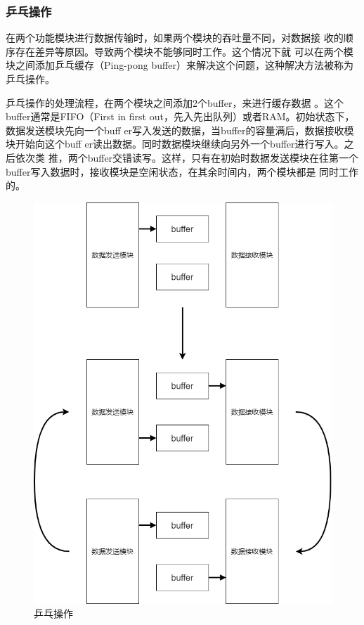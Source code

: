 \documentclass{article}
\numberwithin {equation}{section}
\begin{document}
\begin{spacing}{1.25}
        \subsubsection{乒乓操作}
          \vspace{1em}
          在两个功能模块进行数据传输时，如果两个模块的吞吐量不同，对数据接
          收的顺序存在差异等原因。导致两个模块不能够同时工作。这个情况下就
          可以在两个模块之间添加乒乓缓存（Ping-pong 
          buffer）来解决这个问题，这种解决方法被称为乒乓操作。

          乒乓操作的处理流程，在两个模块之间添加2个buffer，来进行缓存数据
          。这个buffer通常是FIFO（First in first 
          out，先入先出队列）或者RAM。初始状态下，数据发送模块先向一个buff
          er写入发送的数据，当buffer的容量满后，数据接收模块开始向这个buff
          er读出数据。同时数据模块继续向另外一个buffer进行写入。之后依次类
          推，两个buffer交错读写。这样，只有在初始时数据发送模块在往第一个
          buffer写入数据时，接收模块是空闲状态，在其余时间内，两个模块都是
          同时工作的。
          \begin{figure}[H]
            \centering
            \includegraphics[scale=0.3]{./pictures/乒乓操作.png}
            \caption{乒乓操作}
            \label{2D array}
          \end{figure}


\end{spacing}
\end{document}
